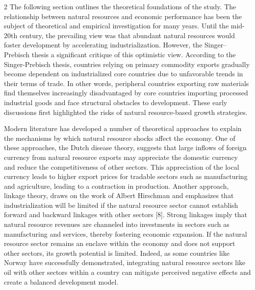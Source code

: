 \begin{multicols}{2}
The following section outlines the theoretical foundations of the study.
The relationship between natural resources and economic performance has
been the subject of theoretical and empirical investigation for many
years. Until the mid-20th century, the prevailing view was that abundant
natural resources would foster development by accelerating
industrialization. However, the Singer--Prebisch thesis a significant
critique of this optimistic view. According to the Singer-Prebisch
thesis, countries relying on primary commodity exports gradually become
dependent on industrialized core countries due to unfavorable trends in
their terms of trade. In other words, peripheral countries exporting raw
materials find themselves increasingly disadvantaged by core countries
importing processed industrial goods and face structural obstacles to
development. These early discussions first highlighted the risks of
natural resource-based growth strategies.

Modern literature has developed a number of theoretical approaches to
explain the mechanisms by which natural resource shocks affect the
economy. One of these approaches, the Dutch disease theory, suggests
that large inflows of foreign currency from natural resource exports may
appreciate the domestic currency and reduce the competitiveness of other
sectors. This appreciation of the local currency leads to higher export
prices for tradable sectors such as manufacturing and agriculture,
leading to a contraction in production. Another approach, linkage
theory, draws on the work of Albert Hirschman and emphasizes that
industrialization will be limited if the natural resource sector cannot
establish forward and backward linkages with other sectors {[}8{]}.
Strong linkages imply that natural resource revenues are channeled into
investments in sectors such as manufacturing and services, thereby
fostering economic expansion. If the natural resource sector remains an
enclave within the economy and does not support other sectors, its
growth potential is limited. Indeed, as some countries like Norway have
successfully demonstrated, integrating natural resource sectors like oil
with other sectors within a country can mitigate perceived negative
effects and create a balanced development model.


\end{multicols}
